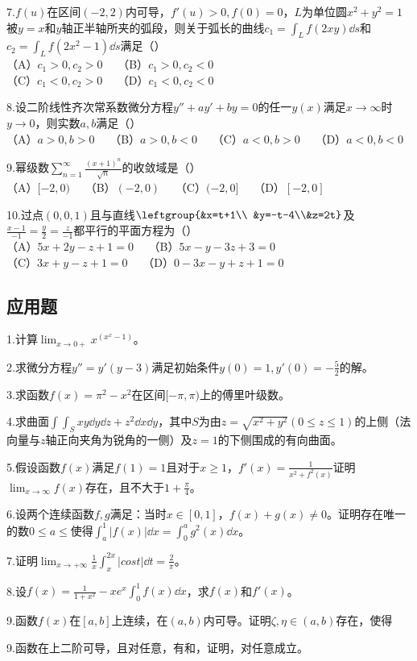 7.$f(u)$在区间$(-2,2)$内可导，$f'(u)>0,f(0)=0$，$L$为单位圆$x^2+y^2=1$被$y=x$和$y$轴正半轴所夹的弧段，则关于弧长的曲线$c_1=\int_{L}f(2xy)\dd{s}$和$c_2=\int_{L}f(2x^2-1)\dd{s}$满足（）\\
（A）$c_1>0,c_2>0\quad$ （B）$c_1>0,c_2<0$\\
 （C）$c_1<0,c_2>0\quad$ （D）$c_1<0,c_2<0$

8.设二阶线性齐次常系数微分方程$y''+ay'+by=0$的任一$y(x)$满足$x \to \infty$时$y \to 0$，则实数$a,b$满足（）\\
（A）$a>0,b>0\quad$ （B）$a>0,b<0\quad$ （C）$a<0,b>0\quad$ （D）$a<0,b<0$

9.幂级数$\displaystyle \sum_{n=1}^{\infty} \frac{(x+1)^n}{\sqrt{n}}$的收敛域是（）\\
（A）$[-2,0)\quad$ （B）$(-2,0)\quad$ （C）$(-2,0]\quad$ （D）$[-2,0]$

10.过点$(0,0,1)$且与直线$\leftgroup{&x=t+1\\ &y=-t-4\\&z=2t}$及$\frac{x-1}{-1}=\frac{y}{2}=\frac{z}{-1}$都平行的平面方程为（）\\
（A）$5x+2y-z+1=0\quad$ （B）$5x-y-3z+3=0$\\
（C）$3x+y-z+1=0\quad$ （D）$0-3x-y+z+1=0$


\subsection{应用题}
1.计算$\displaystyle \lim_{x \to 0+}x^{(x^x-1)}$。


2.求微分方程$y''=y'(y-3)$满足初始条件$y(0)=1,y'(0)=-\frac{5}{2}$的解。


3.求函数$f(x)=\pi ^2-x^2$在区间$[-\pi,\pi)$上的傅里叶级数。

4.求曲面$\int \int_{S}xy\dd{y}\dd{z}+z^2\dd{x}\dd{y}$，其中$S$为由$z=\sqrt{x^2+y^2}(0\leqslant z \leqslant 1)$的上侧（法向量与$z$轴正向夹角为锐角的一侧）及$z=1$的下侧围成的有向曲面。

5.假设函数$f(x)$满足$f(1)=1$且对于$x\geqslant 1$，$f'(x)=\frac{1}{x^2+f^2(x)}$证明$\displaystyle \lim_{x \to \infty }f(x)$存在，且不大于$1+\frac{\pi}{4}$。

6.设两个连续函数$f,g$满足：当时$x \in [0,1]$，$f(x)+g(x)\neq0$。证明存在唯一的数$0\leqslant a \leqslant$使得$\int_{a}^{1}|f(x)|\dd{x}=\int_{0}^{a}g^2(x)\dd{x}$。

7.证明$\displaystyle \lim_{x \to +\infty}\frac{1}{x}\int_x^{2x}|cost|\dd{t}=\frac{2}{\pi}$。

8.设$f(x)=\frac{1}{1+x^2}-xe^x\int_0^1 f(x)\dd{x}$，求$f(x)$和$f'(x)$。

9.函数$f(x)$在$[a,b]$上连续，在$(a,b)$内可导。证明$\zeta,\eta \in (a,b)$存在，使得

9.函数在上二阶可导，且对任意，有和，证明，对任意成立。

